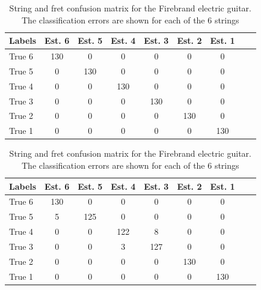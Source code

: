 \documentclass{article}
\begin{document}
\begin{sloppy}
\begin{table}\centering %
\caption{String and fret confusion matrix for the Martin  acoustic guitar. The classification errors are shown for each of the 6 strings.}
\label{tbl:string_confusion_martin}
\begin{tabularx}{0.46\textwidth}{@{}l*{7}{c}c@{}}
\toprule
Labels &Est. 6   &Est. 5 &Est. 4   &Est. 3   &Est. 2   &Est. 1   \\ 
\midrule
True 6   &130 \cellcolor[gray]{.8} &0  &0  &0  &0  &0  \\  
True 5   &0  & 130\cellcolor[gray]{.8} & 0   &0  &0  &0  \\
True 4   &0  &0  &130 \cellcolor[gray]{.8} &0  &0  &0  \\  
True 3   &0  &0  &0  &130 \cellcolor[gray]{.8} &0  &0  \\  
True 2   &0  &0  &0  &0  &130 \cellcolor[gray]{.8} &0  \\  
True 1   &0  &0  &0  &0  &0  &130 \cellcolor[gray]{.8} \\  
\bottomrule
\end{tabularx}
%
\vspace{6mm}
\caption{String and fret confusion matrix for the Firebrand electric guitar. The classification errors are shown for each of the 6 strings}
\label{tbl:str_confusion_firebrand}
\begin{tabularx}{0.46\textwidth}{@{}l*{7}{c}c@{}}
\toprule
Labels &Est. 6   &Est. 5 &Est. 4   &Est. 3   &Est. 2   &Est. 1   \\ 
\midrule
True 6   &130 \cellcolor[gray]{.8}       & 0                        &0      &0  &0  &0 \\
True 5   &5  & 125\cellcolor[gray]{.8}   & 0                        &0      &0  &0  \\
True 4   &0  &0  &122 \cellcolor[gray]{.8}                           & 8 &0  &0  \\
True 3   &0  &0  &3                     &127 \cellcolor[gray]{.8}   & 0   &0  \\
True 2   &0  &0  &0  &0                   &130 \cellcolor[gray]{.8}  & 0  \\
True 1   &0  &0  &0  &0                   &0                          &130 \cellcolor[gray]{.8} \\
\bottomrule %
\end{tabularx}
\end{table}
%


\end{sloppy}
\end{document}
